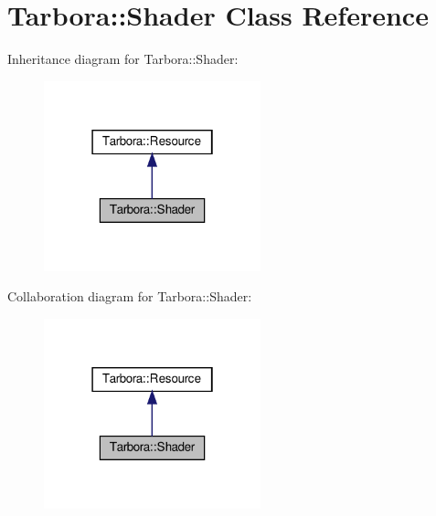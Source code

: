 \hypertarget{classTarbora_1_1Shader}{}\section{Tarbora\+:\+:Shader Class Reference}
\label{classTarbora_1_1Shader}


Inheritance diagram for Tarbora\+:\+:Shader\+:
\nopagebreak
\begin{figure}[H]
\begin{center}
\leavevmode
\includegraphics[width=178pt]{classTarbora_1_1Shader__inherit__graph}
\end{center}
\end{figure}


Collaboration diagram for Tarbora\+:\+:Shader\+:
\nopagebreak
\begin{figure}[H]
\begin{center}
\leavevmode
\includegraphics[width=178pt]{classTarbora_1_1Shader__coll__graph}
\end{center}
\end{figure}
